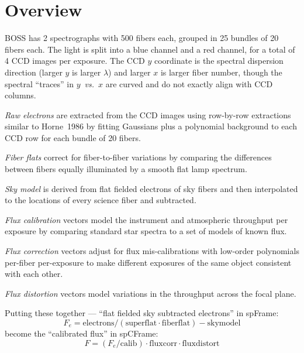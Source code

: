 \documentclass[12pt]{article}
\begin{document}
\maketitle


\section{Overview}

BOSS has 2 spectrographs with 500 fibers each, grouped in 25 bundles of 20
fibers each.  The light is split into a blue channel and a red channel, for
a total of 4 CCD images per exposure. The CCD $y$ coordinate is the spectral
dispersion direction (larger $y$ is larger $\lambda$) and
larger $x$ is larger fiber number, though the spectral ``traces'' in
$y$~{\it vs.}~$x$ are curved and do not exactly align with CCD columns.

{\it Raw electrons} are extracted from the CCD images using row-by-row extractions similar to Horne~1986 by fitting Gaussians plus a polynomial
background to each CCD row for each bundle of 20 fibers.

{\it Fiber flats} correct for fiber-to-fiber variations by comparing the
differences between fibers equally illuminated by a smooth flat lamp spectrum.

{\it Sky model} is derived from flat fielded electrons of sky fibers and then
interpolated to the locations of every science fiber and subtracted.

{\it Flux calibration} vectors model the instrument and atmospheric throughput
per exposure by comparing standard star spectra to a set of models of known
flux.

{\it Flux correction} vectors adjust for flux mis-calibrations with low-order
polynomials per-fiber per-exposure to make different exposures of the same object consistent with each other.

{\it Flux distortion} vectors model variations in the throughput
across the focal plane.

Putting these together --- \newline
``flat fielded sky subtracted electrons'' in spFrame:
\begin{equation}
F_e = \mathrm{electrons} / (\mathrm{superflat} \cdot \mathrm{fiberflat}) -
    \mathrm{skymodel}
\end{equation}
become the ``calibrated flux'' in spCFrame:
\begin{equation}
F = (F_e / \mathrm{calib}) \cdot
    \mathrm{fluxcorr} \cdot \mathrm{fluxdistort}
\end{equation}
\end{document}
